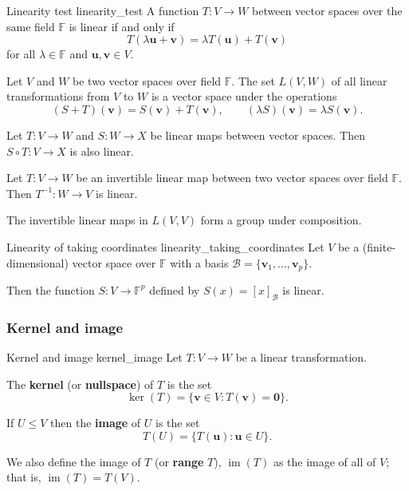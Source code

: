 \begin{lemma}{Linearity test \cite{math2601_notes}}{linearity_test}
	A function $T : V \to W$ between vector spaces over the same field $\mathbb{F}$ is linear if and only if
	$$ T(\lambda \mathbf{u} + \mathbf{v}) = \lambda T(\mathbf{u}) + T(\mathbf{v}) $$
	for all $\lambda \in \mathbb{F}$ and $\mathbf{u},\mathbf{v} \in V$.
\end{lemma}

\begin{theorem}{\cite{math2601_notes}}{}
	Let $V$ and $W$ be two vector spaces over field $\mathbb{F}$. The set $L(V, W)$ of all linear transformations from $V$ to $W$ is a vector space under the operations
	$$
		(S + T)(\mathbf{v}) = S(\mathbf{v}) + T(\mathbf{v}), \qquad
		(\lambda S)(\mathbf{v}) = \lambda S(\mathbf{v}) .
	$$
\end{theorem}

\begin{lemma}{\cite{math2601_notes}}{}
	Let $T : V \to W$ and $S : W \to X$ be linear maps between vector spaces. Then $S \circ T : V \to X$ is also linear.
\end{lemma}

\begin{lemma}{\cite{math2601_notes}}{}
	Let $T : V \to W$ be an invertible linear map between two vector spaces over field $\mathbb{F}$. Then $T^{-1} : W \to V$ is linear.
\end{lemma}

\begin{theorem}{\cite{math2601_notes}}{}
	The invertible linear maps in $L(V, V)$ form a group under composition.
\end{theorem}

\begin{lemma}{Linearity of taking coordinates \cite{math2601_notes}}{linearity_taking_coordinates}
	Let $V$ be a (finite-dimensional) vector space over $\mathbb{F}$ with a basis $\mathcal{B} = \{ \mathbf{v}_1, \ldots, \mathbf{v}_p \}$.

	Then the function $S : V \to \mathbb{F}^p$ defined by $S(x) = [x]_{\mathcal{B}}$ is linear.
\end{lemma}

\subsubsection{Kernel and image}

\begin{definition}{Kernel and image \cite{math2601_notes}}{kernel_image}
	Let $T : V \to W$ be a linear transformation.
	
	The \textbf{kernel} (or \textbf{nullspace}) of $T$ is the set
	$$ \operatorname{ker}(T) = \{ \mathbf{v} \in V : T(\mathbf{v}) = \mathbf{0} \} . $$

	If $U \leq V$ then the \textbf{image} of $U$ is the set
	$$ T(U) = \{ T(\mathbf{u}) : \mathbf{u} \in U \} . $$

	We also define the image of $T$ (or \textbf{range} $T$), $\operatorname{im}(T)$ as the image of all of $V$; that is, $\operatorname{im}(T) = T(V)$.
\end{definition}

